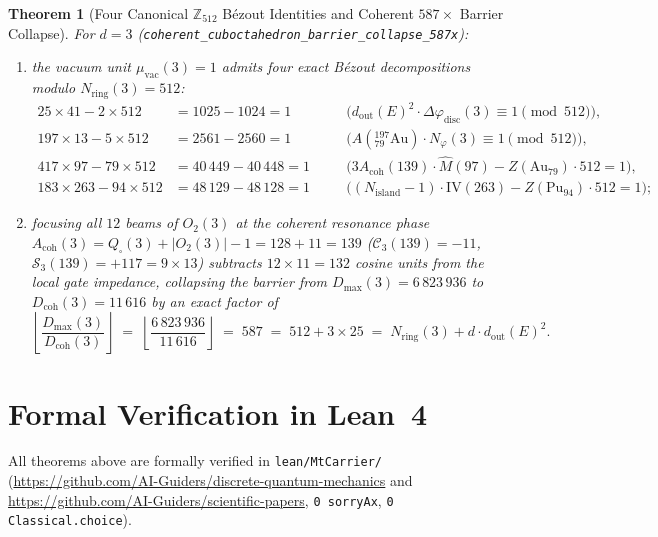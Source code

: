 \documentclass[11pt,a4paper]{article}
\theoremstyle{plain}
\newtheorem{theorem}{Theorem}[section]
\theoremstyle{definition}
\begin{document}
\begin{theorem}[Four Canonical $\mathbb{Z}_{512}$ B\'ezout Identities and Coherent $587\times$ Barrier Collapse]
\label{thm:nuclear-587}
For $d=3$ (\texttt{coherent\_cuboctahedron\_barrier\_collapse\_587x}):
\begin{enumerate}[label=\textbf{(\roman*)},leftmargin=*,noitemsep]
\item the vacuum unit $\mu_{\mathrm{vac}}(3) = 1$ admits four exact B\'ezout decompositions modulo $N_{\mathrm{ring}}(3) = 512$:
  \begin{equation}
    \label{eq:four-bezout-512}
    \begin{aligned}
      25\times 41 - 2\times 512 &= 1025 - 1024 = 1 &\quad &\bigl(d_{\mathrm{out}}(E)^2\cdot\Delta\varphi_{\mathrm{disc}}(3) \equiv 1\pmod{512}\bigr), \\
      197\times 13 - 5\times 512 &= 2561 - 2560 = 1 &\quad &\bigl(A(^{197}_{79}\mathrm{Au})\cdot N_\varphi(3) \equiv 1\pmod{512}\bigr), \\
      417\times 97 - 79\times 512 &= 40\,449 - 40\,448 = 1 &\quad &\bigl(3 A_{\mathrm{coh}}(139)\cdot\hat{M}(97) - Z(\mathrm{Au}_{79})\cdot 512 = 1\bigr), \\
      183\times 263 - 94\times 512 &= 48\,129 - 48\,128 = 1 &\quad &\bigl((N_{\mathrm{island}}-1)\cdot\mathrm{IV}(263) - Z(\mathrm{Pu}_{94})\cdot 512 = 1\bigr);
    \end{aligned}
  \end{equation}
\item focusing all $12$ beams of $O_2(3)$ at the coherent resonance phase $A_{\mathrm{coh}}(3) = Q_\square(3) + |O_2(3)| - 1 = 128 + 11 = 139$ ($\mathcal{C}_3(139) = -11$, $\mathcal{S}_3(139) = +117 = 9\times 13$) subtracts $12\times 11 = 132$ cosine units from the local gate impedance, collapsing the barrier from $D_{\max}(3) = 6\,823\,936$ to $D_{\mathrm{coh}}(3) = 11\,616$ by an exact factor of
  \begin{equation}
    \label{eq:collapse-587}
    \left\lfloor \frac{D_{\max}(3)}{D_{\mathrm{coh}}(3)}\right\rfloor \;=\; \left\lfloor \frac{6\,823\,936}{11\,616}\right\rfloor \;=\; 587 \;=\; 512 + 3\times 25 \;=\; N_{\mathrm{ring}}(3) + d\cdot d_{\mathrm{out}}(E)^2.
  \end{equation}
\end{enumerate}
\end{theorem}

\section{Formal Verification in Lean~4}
All theorems above are formally verified in \texttt{lean/MtCarrier/} (\url{https://github.com/AI-Guiders/discrete-quantum-mechanics} and \url{https://github.com/AI-Guiders/scientific-papers}, \texttt{0 sorryAx}, \texttt{0 Classical.choice}).
\end{document}
